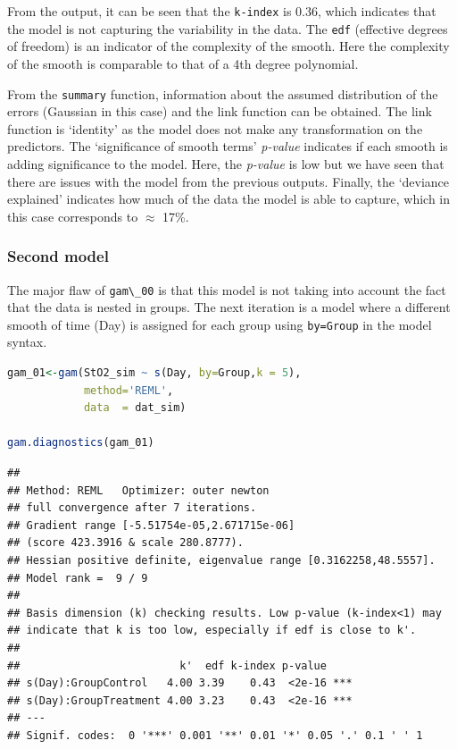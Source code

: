 \documentclass[
]{article}
\newcommand{\passthrough}[1]{#1}
\begin{document}
From the output, it can be seen that the \passthrough{\lstinline!k-index!} is 0.36, which indicates that the model is not capturing the variability in the data. The \passthrough{\lstinline!edf!} (effective degrees of freedom) is an indicator of the complexity of the smooth. Here the complexity of the smooth is comparable to that of a 4th degree polynomial.

From the \passthrough{\lstinline!summary!} function, information about the assumed distribution of the errors (Gaussian in this case) and the link function can be obtained. The link function is `identity' as the model does not make any transformation on the predictors. The `significance of smooth terms' \emph{p-value} indicates if each smooth is adding significance to the model. Here, the \emph{p-value} is low but we have seen that there are issues with the model from the previous outputs. Finally, the `deviance explained' indicates how much of the data the model is able to capture, which in this case corresponds to \(\approx\) 17\%.

\hypertarget{second-model}{%
\subsubsection{Second model}\label{second-model}}

The major flaw of \passthrough{\lstinline!gam\_00!} is that this model is not taking into account the fact that the data is nested in groups. The next iteration is a model where a different smooth of time (Day) is assigned for each group using \passthrough{\lstinline!by=Group!} in the model syntax.

\begin{lstlisting}[language=R]
gam_01<-gam(StO2_sim ~ s(Day, by=Group,k = 5),
            method='REML',
            data  = dat_sim)

gam.diagnostics(gam_01)
\end{lstlisting}

\begin{lstlisting}
## 
## Method: REML   Optimizer: outer newton
## full convergence after 7 iterations.
## Gradient range [-5.51754e-05,2.671715e-06]
## (score 423.3916 & scale 280.8777).
## Hessian positive definite, eigenvalue range [0.3162258,48.5557].
## Model rank =  9 / 9 
## 
## Basis dimension (k) checking results. Low p-value (k-index<1) may
## indicate that k is too low, especially if edf is close to k'.
## 
##                         k'  edf k-index p-value    
## s(Day):GroupControl   4.00 3.39    0.43  <2e-16 ***
## s(Day):GroupTreatment 4.00 3.23    0.43  <2e-16 ***
## ---
## Signif. codes:  0 '***' 0.001 '**' 0.01 '*' 0.05 '.' 0.1 ' ' 1
\end{lstlisting}
\end{document}
